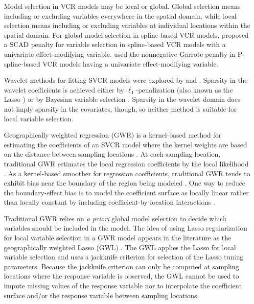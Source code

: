 \documentclass[authoryear, review, 11pt]{elsarticle}
\begin{document}
	Model selection in VCR models may be local or global. Global selection means including or excluding variables everywhere in the spatial domain, while local selection means including or excluding variables at individual locations within the spatial domain. For global model selection in spline-based VCR models, \cite{Wang:2008a} proposed a SCAD penalty \citep{Fan:2001} for variable selection in spline-based VCR models with a univariate effect-modifying variable. \cite{Antoniadis:2012a} used the nonnegative Garrote penalty \citep{Breiman:1995} in P-spline-based VCR models having a univariate effect-modifying variable.
	
	Wavelet methods for fitting SVCR models were explored by \cite{Shang-2011} and \cite{Zhang-2011}. Sparsity in the wavelet coefficients is achieved either by $\ell_1$-penalization (also known as the Lasso \citep{Tibshirani:1996}) \citep{Shang-2011} or by Bayesian variable selection \citep{Zhang-2011}. Sparsity in the wavelet domain does not imply sparsity in the covariates, though, so neither method is suitable for local variable selection.

	Geographically weighted regression (GWR) is a kernel-based method for estimating the coefficients of an SVCR model where the kernel weights are based on the distance between sampling locations \citep{Brundson:1998a, Fotheringham:2002}. At each sampling location, traditional GWR estimates the local regression coefficients by the local likelihood \citep{Loader:1999}. As a kernel-based smoother for regression coefficients, traditional GWR tends to exhibit bias near the boundary of the region being modeled \citep{Hastie:1993b}. One way to reduce the boundary-effect bias is to model the coefficient surface as locally linear rather than locally constant by including coefficient-by-location interactions \citep{Wang:2008b}.
	
	Traditional GWR relies on \emph{a priori} global model selection to decide which variables should be included in the model. The idea of using Lasso regularization for local variable selection in a GWR model appears in the literature as the geographically weighted Lasso (GWL) \citep{Wheeler:2009}. The GWL applies the Lasso for local variable selection and uses a jackknife criterion for selection of the Lasso tuning parameters. Because the jackknife criterion can only be computed at sampling locations where the response variable is observed, the GWL cannot be used to impute missing values of the response variable nor to interpolate the coefficient surface and/or the response variable between sampling locations.
	
\end{document}
